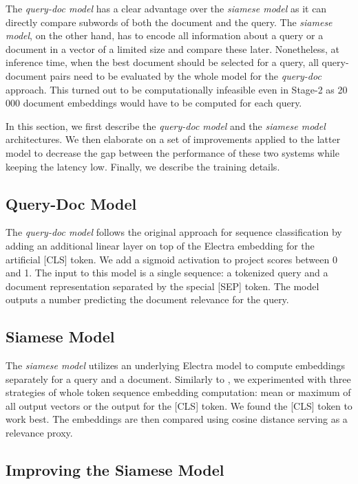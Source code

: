\documentclass[letterpaper]{article} \usepackage{aaai22 }  \usepackage{times}  \usepackage{helvet}  \usepackage{courier}  \usepackage[hyphens]{url}  \usepackage{graphicx} \usepackage{amsmath,amsfonts,amssymb, mathabx,bm,bbm}
\begin{document}
The \textit{query-doc model} has a clear advantage over the \emph{siamese model} as it can directly compare subwords of both the document and the query. The \emph{siamese model}, on the other hand, has to encode all information about a query or a document in a vector of a limited size and compare these later. Nonetheless, at inference time, when the best document should be selected for a query, all query-document pairs need to be evaluated by the whole model for the \textit{query-doc} approach. This turned out to be computationally infeasible even in Stage-2 as 20\,000 document embeddings would have to be computed for each query.

In this section, we first describe the \textit{query-doc model} and the \textit{siamese model} architectures. We then elaborate on a set of improvements applied to the latter model to decrease the gap between the performance of these two systems while keeping the latency low. Finally, we describe the training details. 

\subsection{Query-Doc Model}

The \textit{query-doc model} follows the original approach for sequence classification  \cite{bert} by adding an additional linear layer on top of the Electra embedding for the artificial [CLS] token. We add a sigmoid activation to project scores between 0 and 1. The input to this  model is a single sequence: a tokenized query and a document representation separated by the special [SEP] token. The model outputs a number predicting the document relevance for the query.

\subsection{Siamese Model}

The \textit{siamese model} utilizes an underlying Electra model to compute embeddings separately for a query and a document. Similarly to \citet{sentence_bert}, we experimented with three strategies of whole token sequence embedding computation: mean or maximum of all output vectors or the output for the [CLS] token. We found the [CLS] token to work best. The embeddings are then compared using cosine distance serving as a relevance proxy.

\subsection{Improving the Siamese Model}
\end{document}
